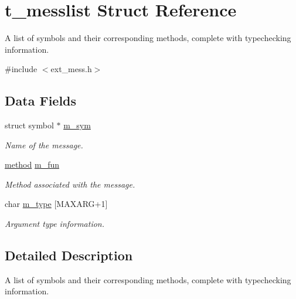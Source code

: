 \hypertarget{structt__messlist}{
\section{t\_\-messlist Struct Reference}
\label{structt__messlist}
}


A list of symbols and their corresponding methods, complete with typechecking information.  


{\ttfamily \#include $<$ext\_\-mess.h$>$}\subsection*{Data Fields}
\begin{DoxyCompactItemize}
\item 
\hypertarget{structt__messlist_a655bf9605625a8089cc30409fe3ad014}{
struct symbol $\ast$ \hyperlink{structt__messlist_a655bf9605625a8089cc30409fe3ad014}{m\_\-sym}}
\label{structt__messlist_a655bf9605625a8089cc30409fe3ad014}

\begin{DoxyCompactList}\small\item\em Name of the message. \item\end{DoxyCompactList}\item 
\hypertarget{structt__messlist_a98c0b1124cb244efbfd711e10e63b7d7}{
\hyperlink{group__datatypes_gac26ba0a173b50597f5738132e059b42d}{method} \hyperlink{structt__messlist_a98c0b1124cb244efbfd711e10e63b7d7}{m\_\-fun}}
\label{structt__messlist_a98c0b1124cb244efbfd711e10e63b7d7}

\begin{DoxyCompactList}\small\item\em Method associated with the message. \item\end{DoxyCompactList}\item 
\hypertarget{structt__messlist_ad732b23d0ed3a4b4bc3acbb071bc8fcf}{
char \hyperlink{structt__messlist_ad732b23d0ed3a4b4bc3acbb071bc8fcf}{m\_\-type} \mbox{[}MAXARG+1\mbox{]}}
\label{structt__messlist_ad732b23d0ed3a4b4bc3acbb071bc8fcf}

\begin{DoxyCompactList}\small\item\em Argument type information. \item\end{DoxyCompactList}\end{DoxyCompactItemize}


\subsection{Detailed Description}
A list of symbols and their corresponding methods, complete with typechecking information. 